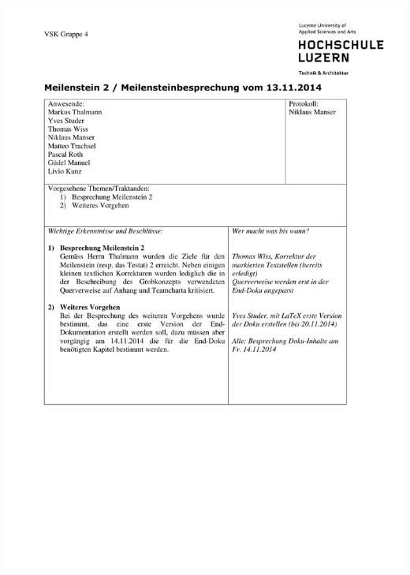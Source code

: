 \begin{appendix}
	            \includegraphics[page=1,width=\textwidth]{Enddokumentation/Anhang/Extern/Besprechung_MS2.pdf}
	            \newpage
            
            \newpage
        \end{appendix}  
